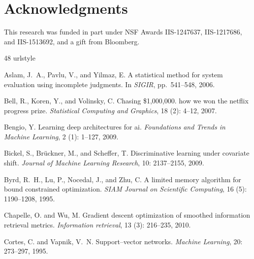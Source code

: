 \documentclass{article}
\begin{document}
\section*{Acknowledgments} 
This research was funded in part under NSF Awards IIS-1247637, IIS-1217686, and IIS-1513692, and a gift from Bloomberg.

%
%

\begin{thebibliography}{48}
\providecommand{\natexlab}[1]{#1}
\providecommand{\url}[1]{\texttt{#1}}
\expandafter\ifx\csname urlstyle\endcsname\relax
  \providecommand{\doi}[1]{doi: #1}\else
  \providecommand{\doi}{doi: \begingroup \urlstyle{rm}\Url}\fi

Aslam, J.~A., Pavlu, V., and Yilmaz, E.
\newblock A statistical method for system evaluation using incomplete
  judgments.
\newblock In \emph{SIGIR}, pp.\  541--548, 2006.

Bell, R., Koren, Y., and Volinsky, C.
\newblock Chasing \$1,000,000. how we won the netflix progress prize.
\newblock \emph{Statistical Computing and Graphics}, 18 (2):
  4--12, 2007.

Bengio, Y.
\newblock Learning deep architectures for ai.
\newblock \emph{Foundations and Trends in Machine Learning}, 2
  (1): 1--127, 2009.

Bickel, S., Br{\"u}ckner, M., and Scheffer, T.
\newblock Discriminative learning under covariate shift.
\newblock \emph{Journal of Machine Learning Research}, 10: 2137--2155,
  2009.

Byrd, R.~H., Lu, P., Nocedal, J., and Zhu, C.
\newblock A limited memory algorithm for bound constrained optimization.
\newblock \emph{SIAM Journal on Scientific Computing}, 16
  (5): 1190--1208, 1995.

Chapelle, O. and Wu, M.
\newblock Gradient descent optimization of smoothed information retrieval
  metrics.
\newblock \emph{Information retrieval}, 13 (3): 216--235,
  2010.

Cortes, C. and Vapnik, V.~N.
\newblock Support--vector networks.
\newblock \emph{Machine Learning}, 20: 273--297, 1995.


\end{thebibliography}
\end{document}
